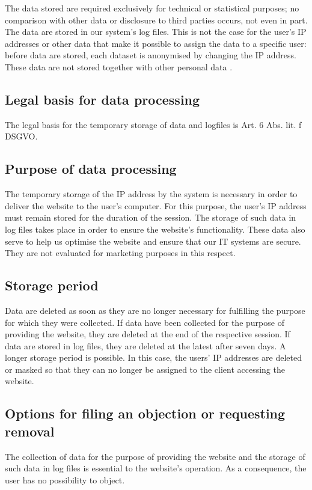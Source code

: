 \documentclass[letterpaper,10pt,english]{sphinxmanual}
\begin{document}
\sphinxAtStartPar
The data stored are required exclusively for technical or statistical purposes; no comparison with other data or disclosure to third parties occurs, not even in part. The data are stored in our system’s log files. This is not the case for the user’s IP addresses or other data that make it possible to assign the data to a specific user: before data are stored, each dataset is anonymised by changing the IP address. These data are not stored together with other personal data .


\subsection{Legal basis for data processing}
\label{\detokenize{policies/privacy:legal-basis-for-data-processing}}
\sphinxAtStartPar
The legal basis for the temporary storage of data and logfiles is Art. 6 Abs. lit. f DSGVO.


\subsection{Purpose of data processing}
\label{\detokenize{policies/privacy:purpose-of-data-processing}}
\sphinxAtStartPar
The temporary storage of the IP address by the system is necessary in order to deliver the website to the user’s computer. For this purpose, the user’s IP address must remain stored for the duration of the session.
The storage of such data in log files takes place in order to ensure the website’s functionality. These data also serve to help us optimise the website and ensure that our IT systems are secure. They are not evaluated for marketing purposes in this respect.


\subsection{Storage period}
\label{\detokenize{policies/privacy:storage-period}}
\sphinxAtStartPar
Data are deleted as soon as they are no longer necessary for fulfilling the purpose for which they were collected. If data have been collected for the purpose of providing the website, they are deleted at the end of the respective session.
If data are stored in log files, they are deleted at the latest after seven days. A longer storage period is possible. In this case, the users’ IP addresses are deleted or masked so that they can no longer be assigned to the client accessing the website.


\subsection{Options for filing an objection or requesting removal}
\label{\detokenize{policies/privacy:options-for-filing-an-objection-or-requesting-removal}}
\sphinxAtStartPar
The collection of data for the purpose of providing the website and the storage of such data in log files is essential to the website’s operation. As a consequence, the user has no possibility to object.
\end{document}
